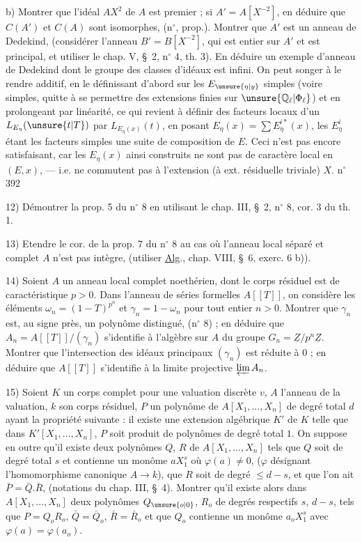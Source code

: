 b) Montrer que l'idéal $AX^2$ de $A$ est premier ; si $A'=A[X^{-2}]$, en déduire que $C(A')$ et $C(A)$ sont isomorphes, (n$^{\circ}$\qquad, prop.\qquad). Montrer que $A'$ est un anneau de Dedekind, (considérer l'anneau $B'=B[X^{-2}]$, qui est entier sur $A'$ et est principal, et utiliser le chap. V, \S~2, n$^{\circ}$ 4, th. 3). En déduire un exemple d'anneau de Dedekind dont le groupe des classes d'idéaux est infini.
On peut songer à le rendre additif, en le définissant d'abord sur les $E_{\unsure{\eta|y}}$ simples (voire  simples, quitte à se permettre des extensions finies sur $\unsure{\mathbb{Q}_{\ell}|\Phi_{\ell}}$) et en prolongeant par linéarité, ce qui revient à définir des facteurs locaux d'un $L_{E_\eta}(\unsure{t|T})$ par $L_{E_\eta(x)}(t)$, en posant $E_\eta(x)=\sum E_\eta^{i*}(x)$, les $E_\eta^i$ étant les facteurs simples  une suite de composition de $E$. Ceci n'est pas encore satisfaisant, car les $E_\eta(x)$ ainsi construits ne sont pas de caractère local en $(E,x)$, --- i.e. ne commutent pas à l'extension   (à ext. résiduelle   triviale)  $X$.
\hfill n$^{\circ}$ 392

12) Démontrer la prop. 5 du n$^{\circ}$ 8 en utilisant le chap. III, \S~2, n$^{\circ}$ 8, cor. 3 du th. 1.

13) Etendre le cor. de la prop. 7 du n$^{\circ}$ 8 au cas où l'anneau local séparé et complet $A$ n'est pas intègre, (utiliser \uline{Alg}., chap. VIII, \S~6, exerc. 6 b)).

14) Soient $A$ un anneau local complet noethérien, dont le corps résiduel est de caractéristique $p>0$. Dans l'anneau de séries formelles $A[[T]]$, on considère les éléments $\omega_n=(1-T)^{p^n}$ et $\gamma_n=1-\omega_n$ pour tout entier $n>0$. Montrer que $\gamma_n$ est, au signe près, un polynôme distingué, (n$^{\circ}$ 8) ; en déduire que $A_n=A[[T]]/(\gamma_n)$ s'identifie à l'algèbre sur $A$ du groupe $G_n=\underline{Z}/p^n\underline{Z}$. Montrer que l'intersection des idéaux principaux $(\gamma_n)$ est réduite à $0$ ; en déduire que $A[[T]]$ s'identifie à la limite projective $\varprojlim A_n$.

15) Soient $K$ un corps complet pour une valuation discrète $v$, $A$ l'anneau de la valuation, $k$ son corps résiduel, $P$ un polynôme de $A[X_1,\ldots,X_n]$ de degré total $d$ ayant la propriété suivante : il existe une extension algébrique $K'$ de $K$ telle que dans $K'[X_1,\ldots,X_n]$, $P$ soit produit de polynômes de degré total $1$. On suppose en outre qu'il existe deux polynômes $Q$, $R$ de $A[X_1,\ldots,X_n]$ tels que $Q$ soit de degré total $s$ et contienne un monôme $aX_1^s$ où $\varphi(a)\ne 0$, ($\varphi$ désignant l'homomorphisme canonique $A\longrightarrow k$), que $R$ soit de degré $\leq d-s$, et que l'on ait $\bar P=\bar Q.\bar R$, (notations du chap. III, \S~4). Montrer qu'il existe alors dans $A[X_1,\ldots,X_n]$ deux polynômes $Q_{\unsure{o|0}}$, $R_o$ de degrés respectifs $s$, $d-s$, tels que $P=Q_oR_o$, $\bar Q=\bar Q_o$, $\bar R=\bar R_o$ et que $Q_o$ contienne un monôme $a_oX_1^s$ avec $\varphi(a)=\varphi(a_o)$.

